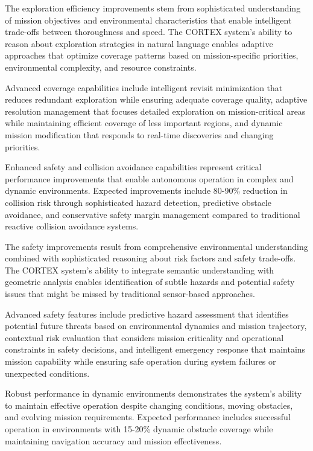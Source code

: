 The exploration efficiency improvements stem from sophisticated understanding of mission objectives and environmental characteristics that enable intelligent trade-offs between thoroughness and speed. The CORTEX system's ability to reason about exploration strategies in natural language enables adaptive approaches that optimize coverage patterns based on mission-specific priorities, environmental complexity, and resource constraints.

Advanced coverage capabilities include intelligent revisit minimization that reduces redundant exploration while ensuring adequate coverage quality, adaptive resolution management that focuses detailed exploration on mission-critical areas while maintaining efficient coverage of less important regions, and dynamic mission modification that responds to real-time discoveries and changing priorities.

Enhanced safety and collision avoidance capabilities represent critical performance improvements that enable autonomous operation in complex and dynamic environments. Expected improvements include 80-90\% reduction in collision risk through sophisticated hazard detection, predictive obstacle avoidance, and conservative safety margin management compared to traditional reactive collision avoidance systems.

The safety improvements result from comprehensive environmental understanding combined with sophisticated reasoning about risk factors and safety trade-offs. The CORTEX system's ability to integrate semantic understanding with geometric analysis enables identification of subtle hazards and potential safety issues that might be missed by traditional sensor-based approaches.

Advanced safety features include predictive hazard assessment that identifies potential future threats based on environmental dynamics and mission trajectory, contextual risk evaluation that considers mission criticality and operational constraints in safety decisions, and intelligent emergency response that maintains mission capability while ensuring safe operation during system failures or unexpected conditions.

Robust performance in dynamic environments demonstrates the system's ability to maintain effective operation despite changing conditions, moving obstacles, and evolving mission requirements. Expected performance includes successful operation in environments with 15-20\% dynamic obstacle coverage while maintaining navigation accuracy and mission effectiveness.

